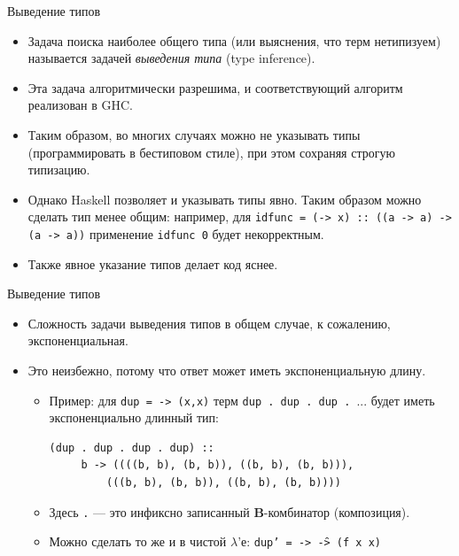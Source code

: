 \documentclass[xcolor=dvipsnames]{beamer}
\newcommand{\Bx}{\mathbf{B}}
\begin{document}
\begin{frame}{Выведение типов}
 
 \begin{itemize}[<+->]
  \item Задача поиска наиболее общего типа (или выяснения, что терм нетипизуем) называется задачей {\em выведения типа} (type inference).
  
  \item Эта задача алгоритмически разрешима, и соответствующий алгоритм реализован в GHC.
  
  \item Таким образом, во многих случаях можно не указывать типы (программировать в бестиповом стиле), при этом сохраняя строгую типизацию.
  
  \item Однако Haskell позволяет и указывать типы явно. Таким образом можно сделать тип менее общим: например, для
  \texttt{idfunc = (\x -> x) :: ((a -> a) -> (a -> a))} применение \texttt{idfunc 0} будет некорректным.
  
  \item Также явное указание типов делает код яснее.
 \end{itemize}

\end{frame}

\begin{frame}[fragile]{Выведение типов}

\begin{itemize}[<+->]
 \item Сложность задачи выведения типов в общем случае, к сожалению, экспоненциальная.
 
 \item Это неизбежно, потому что ответ может иметь экспоненциальную длину.
 \begin{itemize}

 \item Пример: для \texttt{dup = \x -> (x,x)} терм \texttt{dup . dup . dup . }... будет иметь экспоненциально длинный тип:
 \begin{verbatim}
(dup . dup . dup . dup) :: 
     b -> ((((b, b), (b, b)), ((b, b), (b, b))),
         (((b, b), (b, b)), ((b, b), (b, b))))
 \end{verbatim}
\item Здесь \texttt{.} --- это инфиксно записанный $\Bx$-комбинатор (композиция).
\item Можно сделать то же и в чистой $\lambda$'е:
\texttt{dup' = \x -> \f -> (f x x)}
 \end{itemize}
\end{itemize}

 
\end{frame}
\end{document}
